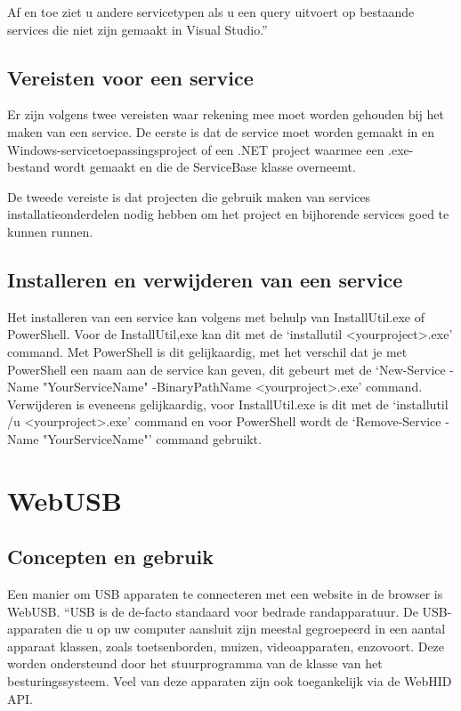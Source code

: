 Af en toe ziet u andere servicetypen als u een query uitvoert op bestaande services die niet zijn gemaakt in Visual Studio.''\autocite{DevMozService}

\subsection{Vereisten voor een service}
Er zijn volgens \textcite{DevMozService} twee vereisten waar rekening mee moet worden gehouden bij het maken van een service. De eerste is dat de service moet worden gemaakt in en Windows-servicetoepassingsproject of een .NET project waarmee een .exe-bestand wordt gemaakt en die de ServiceBase klasse overneemt. 

De tweede vereiste is dat projecten die gebruik maken van services installatieonderdelen nodig hebben om het project en bijhorende services goed te kunnen runnen. 

\subsection{Installeren en verwijderen van een service}
Het installeren van een service kan volgens \textcite{DevMozServiceInstall} met behulp van InstallUtil.exe of PowerShell. Voor de InstallUtil,exe kan dit met de ‘installutil <yourproject>.exe’ command. Met PowerShell is dit gelijkaardig, met het verschil dat je met PowerShell een naam aan de service kan geven, dit gebeurt met de ‘New-Service -Name "YourServiceName" -BinaryPathName <yourproject>.exe’ command. Verwijderen is eveneens gelijkaardig, voor InstallUtil.exe is dit met de ‘installutil /u <yourproject>.exe’ command en voor PowerShell wordt de ‘Remove-Service -Name "YourServiceName"’ command gebruikt. 





\section{WebUSB}
\subsection{Concepten en gebruik}
Een manier om USB apparaten te connecteren met een website in de browser is WebUSB.
``USB is de de-facto standaard voor bedrade randapparatuur. De USB-apparaten die u op uw computer aansluit zijn meestal gegroepeerd in een aantal apparaat klassen, zoals toetsenborden, muizen, videoapparaten, enzovoort. Deze worden ondersteund door het stuurprogramma van de klasse van het besturingssysteem. Veel van deze apparaten zijn ook toegankelijk via de WebHID API.


